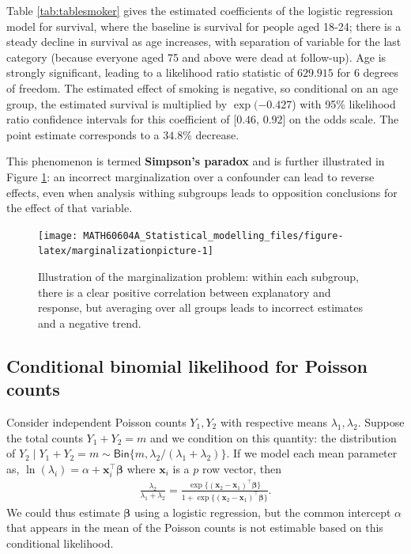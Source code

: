 \documentclass[
  11pt,
  letterpaper,
]{book}
\theoremstyle{definition}
\theoremstyle{definition}
\theoremstyle{definition}
\theoremstyle{definition}
\theoremstyle{remark}
\begin{document}
Table \ref{tab:tablesmoker} gives the estimated coefficients of the logistic regression model for survival, where the baseline is survival for people aged 18-24; there is a steady decline in survival as age increases, with separation of variable for the last category (because everyone aged 75 and above were dead at follow-up). Age is strongly significant, leading to a likelihood ratio statistic of \(629.915\) for 6 degrees of freedom. The estimated effect of smoking is negative, so conditional on an age group, the estimated survival is multiplied by \(\exp(-0.427\)) with 95\% likelihood ratio confidence intervals for this coefficient of {[}\(0.46\), \(0.92\){]} on the odds scale. The point estimate corresponds to a \(34.8\)\% decrease.

This phenomenon is termed \textbf{Simpson's paradox} and is further illustrated in Figure \ref{fig:marginalizationpicture}: an incorrect marginalization over a confounder can lead to reverse effects, even when analysis withing subgroups leads to opposition conclusions for the effect of that variable.

\begin{figure}

{\centering \texttt{[image: MATH60604A\_Statistical\_modelling\_files/figure-latex/marginalizationpicture-1]} 

}

\caption{Illustration of the marginalization problem: within each subgroup, there is a clear positive correlation between explanatory and response, but averaging over all groups leads to incorrect estimates and a negative trend.}\label{fig:marginalizationpicture}
\end{figure}

\hypertarget{conditional-binomial-likelihood-for-poisson-counts}{%
\subsection{Conditional binomial likelihood for Poisson counts}\label{conditional-binomial-likelihood-for-poisson-counts}}

Consider independent Poisson counts \(Y_1, Y_2\) with respective means \(\lambda_1, \lambda_2\). Suppose the total counts \(Y_1 + Y_2 = m\) and we condition on this quantity: the distribution of \(Y_2 \mid Y_1 + Y_2=m \sim \mathsf{Bin}\{m, \lambda_2/(\lambda_1 + \lambda_2)\}\).
If we model each mean parameter as, \(\ln(\lambda_i) = \alpha + \mathbf{x}_i^\top\boldsymbol{\beta}\) where \(\mathbf{x}_i\) is a \(p\) row vector, then
\begin{align*}
\frac{\lambda_2}{\lambda_1 + \lambda_2} = \frac{\exp\{(\mathbf{x}_2-\mathbf{x}_1)^\top\boldsymbol{\beta}\}}{1+\exp\{(\mathbf{x}_2-\mathbf{x}_1)^\top\boldsymbol{\beta}\}}.
\end{align*}
We could thus estimate \(\boldsymbol{\beta}\) using a logistic regression, but the common intercept \(\alpha\) that appears in the mean of the Poisson counts is not estimable based on this conditional likelihood.
\end{document}
